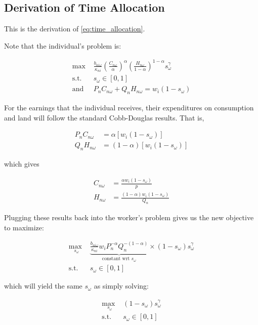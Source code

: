 \documentclass[10pt]{article}
\begin{document}
\subsection{Derivation of Time Allocation}
\label{sec:time_allocation}

This is the derivation of \eqref{eq:time_allocation}.

Note that the individual's problem is:

\begin{align}
    \text{max } &\frac{b_{n i \omega}}{\kappa_{n i}}\left(\frac{C_{n \omega}}{\alpha}\right)^\alpha\left(\frac{H_{n \omega}}{1-\alpha}\right)^{1-\alpha} s_\omega^\gamma \\
    \text{s.t. } &s_\omega \in [0,1] \\
    \text{and } & P_n C_{n \omega}+Q_n H_{n \omega}=w_i\left(1-s_\omega\right)
\end{align}

For the earnings that the individual receives, their expenditures 
on consumption and land will follow the standard Cobb-Douglas 
results. That is,

\begin{align}
    P_n C_{n \omega}&=\alpha\left[w_i\left(1-s_\omega\right)\right] \\
    Q_n H_{n \omega}&=(1-\alpha)\left[w_i\left(1-s_\omega\right)\right]
\end{align}

which gives 

\begin{align}
    C_{n \omega}&=\frac{\alpha w_i\left(1-s_\omega\right)}{p} \\
    H_{n \omega}&=\frac{(1-\alpha) w_i\left(1-s_\omega\right)}{Q_n}
\end{align}

Plugging these results back into the worker's problem gives us
the new objective to maximize:

\begin{align}
    \underset{s_\omega}{\text{max }} &\underbrace{\frac{b_{n i \omega}}{\kappa_{n i}} w_i P_n^{-\alpha} Q_n^{-(1-\alpha)}}_{\text {constant wrt } s_\omega} \times\left(1-s_\omega\right) s_\omega^\gamma \\
    \text{s.t. } &s_\omega \in [0,1]
\end{align}

which will yield the same $s_\omega$ as simply solving:

\begin{align}
    \underset{s_\omega}{\text{max }} &\left(1-s_\omega\right) s_\omega^\gamma \\
    \text{s.t. } &s_\omega \in [0,1]
\end{align}
\end{document}
